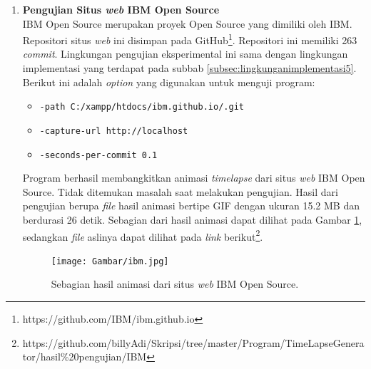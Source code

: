 \begin{enumerate}
\item \textbf{Pengujian Situs \textit{web} IBM Open Source}\\
IBM Open Source merupakan proyek Open Source yang dimiliki oleh IBM. Repositori situs \textit{web} ini disimpan pada GitHub\footnote{https://github.com/IBM/ibm.github.io}. Repositori ini memiliki 263 \textit{commit}. Lingkungan pengujian eksperimental ini sama dengan lingkungan implementasi yang terdapat pada subbab \ref{subsec:lingkunganimplementasi5}. Berikut ini adalah \textit{option} yang digunakan untuk menguji program:
\begin{itemize}
\item \texttt{-path C:/xampp/htdocs/ibm.github.io/.git}
\item \texttt{-capture-url http://localhost}
\item \texttt{-seconds-per-commit 0.1} 
\end{itemize}
Program berhasil membangkitkan animasi \textit{timelapse} dari situs \textit{web} IBM Open Source. Tidak ditemukan masalah saat melakukan pengujian. Hasil dari pengujian berupa \textit{file} hasil animasi bertipe GIF dengan ukuran 15.2 MB dan berdurasi 26 detik. Sebagian dari hasil animasi dapat dilihat pada Gambar \ref{fig:hasil_ibm}, sedangkan \textit{file} aslinya dapat dilihat pada \textit{link} berikut\footnote{https://github.com/billyAdi/Skripsi/tree/master/Program/TimeLapseGenerator/hasil\%20pengujian/IBM}.



\begin{figure}[H]	
		\texttt{[image: Gambar/ibm.jpg]}
	\caption{Sebagian hasil animasi dari situs \textit{web} IBM Open Source.}
	\label{fig:hasil_ibm}
\end{figure}



\end{enumerate}
